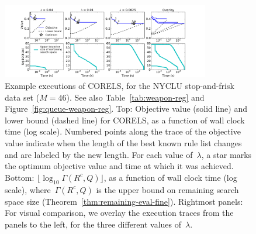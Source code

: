 \documentclass[twoside,11pt]{article}
\def\Reg{{\lambda}}
\def\CurrentObj{{R^c}}
\def\Remaining{\Gamma}
\def\Queue{Q}
\begin{document}
\begin{figure}[t!]
\begin{center}
\includegraphics[trim={35mm 0mm 35mm 15mm},
width=0.81\textwidth]{figs/weapon_reg-execution.pdf}
\end{center}
\vspace{-5mm}
\caption{Example executions of CORELS, for the NYCLU stop-and-frisk data set (${M = 46}$).
%
See also Table~\ref{tab:weapon-reg} and Figure~\ref{fig:queue-weapon-reg}.
%
Top: Objective value (solid line) and lower bound (dashed line) for CORELS,
as a function of wall clock time (log scale).
%
Numbered points along the trace of the objective value
indicate when the length of the best known rule list changes
and are labeled by the new length.
%
For each value of~$\Reg$, a star marks the optimum objective value
and time at which it was achieved.
%
Bottom: $\lfloor \log_{10} \Remaining(\CurrentObj, \Queue) \rfloor$,
as a function of wall clock time (log scale),
where~$\Remaining(\CurrentObj, \Queue)$
is the upper bound on remaining search space size
(Theorem~\ref{thm:remaining-eval-fine}).
%
Rightmost panels: For visual comparison, we overlay the execution traces
from the panels to the left, for the three different values of~$\Reg$.
}
\label{fig:weapon-reg-execution}
\end{figure}
%
\end{document}
